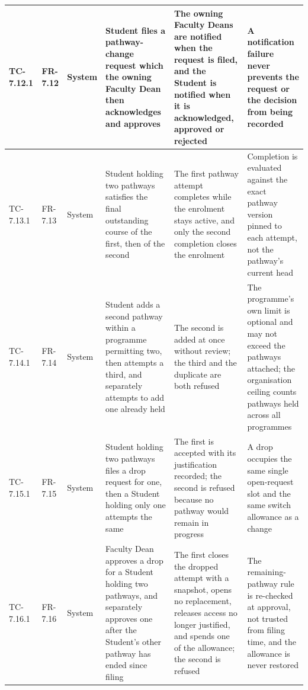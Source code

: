 \begin{longtable}{|>{\centering\arraybackslash}m{}|>{\centering\arraybackslash}m{}|>{\centering\arraybackslash}m{}|m{}|m{}|m{}|}
TC-7.12.1 & FR-7.12 & System & Student files a pathway-change request which the owning Faculty Dean then acknowledges and approves & The owning Faculty Deans are notified when the request is filed, and the Student is notified when it is acknowledged, approved or rejected & A notification failure never prevents the request or the decision from being recorded \\ \hline

TC-7.13.1 & FR-7.13 & System & Student holding two pathways satisfies the final outstanding course of the first, then of the second & The first pathway attempt completes while the enrolment stays active, and only the second completion closes the enrolment & Completion is evaluated against the exact pathway version pinned to each attempt, not the pathway's current head \\ \hline

TC-7.14.1 & FR-7.14 & System & Student adds a second pathway within a programme permitting two, then attempts a third, and separately attempts to add one already held & The second is added at once without review; the third and the duplicate are both refused & The programme's own limit is optional and may not exceed the pathways attached; the organisation ceiling counts pathways held across all programmes \\ \hline

TC-7.15.1 & FR-7.15 & System & Student holding two pathways files a drop request for one, then a Student holding only one attempts the same & The first is accepted with its justification recorded; the second is refused because no pathway would remain in progress & A drop occupies the same single open-request slot and the same switch allowance as a change \\ \hline

TC-7.16.1 & FR-7.16 & System & Faculty Dean approves a drop for a Student holding two pathways, and separately approves one after the Student's other pathway has ended since filing & The first closes the dropped attempt with a snapshot, opens no replacement, releases access no longer justified, and spends one of the allowance; the second is refused & The remaining-pathway rule is re-checked at approval, not trusted from filing time, and the allowance is never restored \\ \hline

\end{longtable}


